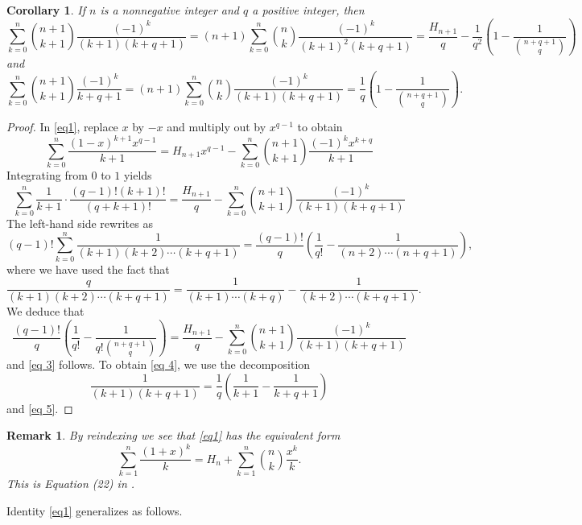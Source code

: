 \documentclass[11pt,reqno]{amsart}
\theoremstyle{plain}
\numberwithin{equation}{section}
\newtheorem{corollary}[thm]{Corollary}
\newtheorem{remark}[thm]{Remark}
\begin{document}
\begin{corollary}
If $n$ is a nonnegative integer and $q$ a positive integer, then
\begin{equation}\label{eq 3}
\sum_{k=0}^n \binom{n+1}{k+1} \frac{(-1)^k}{(k+1)(k+q+1)} =(n+1)\sum_{k=0}^n \binom{n}{k} \frac{(-1)^k}{(k+1)^2(k+q+1)} = \frac{H_{n+1}}{q}-\frac{1}{q^2}\left(1-\frac{1}{\binom{n+q+1}{q}}\right)
\end{equation}
and
\begin{equation}\label{eq 4}
\sum_{k=0}^n \binom{n+1}{k+1} \frac{(-1)^k}{k+q+1} = (n+1)\sum_{k=0}^n \binom{n}{k} \frac{(-1)^k}{(k+1)(k+q+1)} 
= \frac{1}{q}\left(1-\frac{1}{\binom{n+q+1}{q}}\right).
\end{equation}
\end{corollary}
\begin{proof}
In \eqref{eq1}, replace $x$ by $-x$ and multiply out by $x^{q-1}$ to obtain
\[\sum_{k=0}^n\frac{(1-x)^{k+1}x^{q-1}}{k+1}=H_{n+1}x^{q-1}-\sum_{k=0}^n\binom{n+1}{k+1}\frac{(-1)^k x^{k+q}}{k+1}\]
Integrating from $0$ to $1$ yields
\[\sum_{k=0}^n\frac{1}{k+1}\cdot\frac{(q-1)!(k+1)!}{(q+k+1)!}=\frac{H_{n+1}}{q}- \sum_{k=0}^n\binom{n+1}{k+1}\frac{(-1)^k }{(k+1)(k+q+1)}\]
The left-hand side rewrites as 
\[(q-1)!\sum_{k=0}^n \frac{1}{(k+1)(k+2)\cdots (k+q+1)}=\frac{(q-1)!}{q}\left(\frac{1}{ q!}-\frac{1}{(n+2)\cdots (n+q+1)}\right),\]
where we have used the fact that
\[\frac{q}{(k+1)(k+2)\cdots (k+q+1)}=\frac{1}{(k+1)\cdots (k+q)}-\frac{1}{(k+2)\cdots (k+q+1)}.\]
We deduce that
\[\frac{(q-1)!}{q}\left(\frac{1}{ q!}-\frac{1}{q!\binom{n+q+1}{q}}\right)=\frac{H_{n+1}}{q}- \sum_{k=0}^n\binom{n+1}{k+1}\frac{(-1)^k }{(k+1)(k+q+1)}\]
and \eqref{eq 3} follows. To obtain \eqref{eq 4}, we use the decomposition 
\[\frac{1}{(k+1)(k+q+1)}=\frac{1}{q}\left(\frac{1}{k+1}-\frac{1}{k+q+1}\right)\]
and \eqref{eq 5}.
\end{proof}

\begin{remark}
By reindexing we see that \eqref{eq1} has the equivalent form
\begin{equation*}
\sum_{k=1}^n \frac{(1+x)^k}{k} = H_n + \sum_{k=1}^n \binom{n}{k} \frac{x^k}{k}.
\end{equation*}
This is Equation (22) in \cite{Adegoke}. 
\end{remark}

Identity \eqref{eq1} generalizes as follows.
\end{document}
